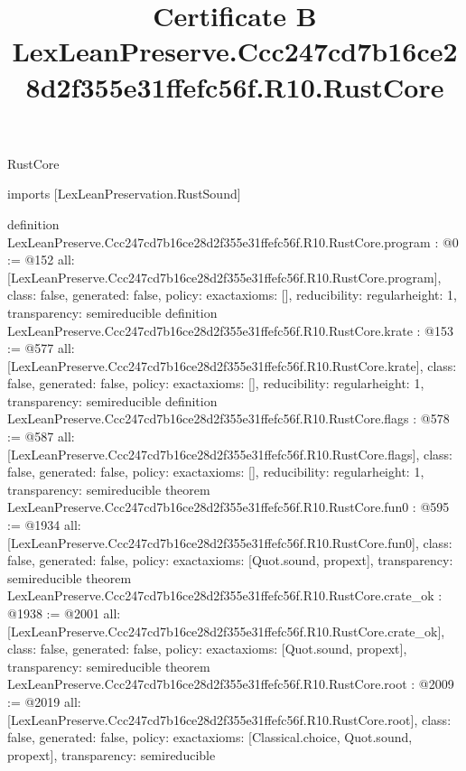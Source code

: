 \begin{lexlean}{RustCore}
\title{Certificate B LexLeanPreserve.Ccc247cd7b16ce28d2f355e31ffefc56f.R10.RustCore}
\begin{coremodule}
imports [LexLeanPreservation.RustSound]

definition LexLeanPreserve.Ccc247cd7b16ce28d2f355e31ffefc56f.R10.RustCore.program : @0 := @152 {
  all: [LexLeanPreserve.Ccc247cd7b16ce28d2f355e31ffefc56f.R10.RustCore.program],
  class: false,
  generated: false,
  policy: exact{axioms: []},
  reducibility: regular{height: 1},
  transparency: semireducible
}
definition LexLeanPreserve.Ccc247cd7b16ce28d2f355e31ffefc56f.R10.RustCore.krate : @153 := @577 {
  all: [LexLeanPreserve.Ccc247cd7b16ce28d2f355e31ffefc56f.R10.RustCore.krate],
  class: false,
  generated: false,
  policy: exact{axioms: []},
  reducibility: regular{height: 1},
  transparency: semireducible
}
definition LexLeanPreserve.Ccc247cd7b16ce28d2f355e31ffefc56f.R10.RustCore.flags : @578 := @587 {
  all: [LexLeanPreserve.Ccc247cd7b16ce28d2f355e31ffefc56f.R10.RustCore.flags],
  class: false,
  generated: false,
  policy: exact{axioms: []},
  reducibility: regular{height: 1},
  transparency: semireducible
}
theorem LexLeanPreserve.Ccc247cd7b16ce28d2f355e31ffefc56f.R10.RustCore.fun0 : @595 := @1934 {
  all: [LexLeanPreserve.Ccc247cd7b16ce28d2f355e31ffefc56f.R10.RustCore.fun0],
  class: false,
  generated: false,
  policy: exact{axioms: [Quot.sound, propext]},
  transparency: semireducible
}
theorem LexLeanPreserve.Ccc247cd7b16ce28d2f355e31ffefc56f.R10.RustCore.crate_ok : @1938 := @2001 {
  all: [LexLeanPreserve.Ccc247cd7b16ce28d2f355e31ffefc56f.R10.RustCore.crate_ok],
  class: false,
  generated: false,
  policy: exact{axioms: [Quot.sound, propext]},
  transparency: semireducible
}
theorem LexLeanPreserve.Ccc247cd7b16ce28d2f355e31ffefc56f.R10.RustCore.root : @2009 := @2019 {
  all: [LexLeanPreserve.Ccc247cd7b16ce28d2f355e31ffefc56f.R10.RustCore.root],
  class: false,
  generated: false,
  policy: exact{axioms: [Classical.choice, Quot.sound, propext]},
  transparency: semireducible
}


\end{coremodule}
\end{lexlean}
